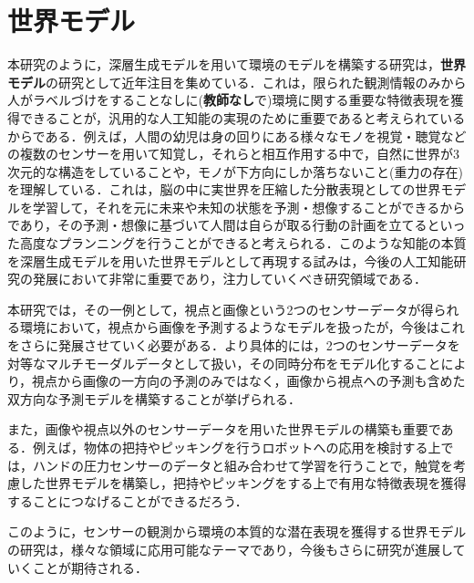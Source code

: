 \section{世界モデル}
本研究のように，深層生成モデルを用いて環境のモデルを構築する研究は，{\bf 世界モデル}の研究として近年注目を集めている．これは，限られた観測情報のみから人がラベルづけをすることなしに({\bf 教師なし}で)環境に関する重要な特徴表現を獲得できることが，汎用的な人工知能の実現のために重要であると考えられているからである．例えば，人間の幼児は身の回りにある様々なモノを視覚・聴覚などの複数のセンサーを用いて知覚し，それらと相互作用する中で，自然に世界が3次元的な構造をしていることや，モノが下方向にしか落ちないこと(重力の存在)を理解している．これは，脳の中に実世界を圧縮した分散表現としての世界モデルを学習して，それを元に未来や未知の状態を予測・想像することができるからであり，その予測・想像に基づいて人間は自らが取る行動の計画を立てるといった高度なプランニングを行うことができると考えられる．このような知能の本質を深層生成モデルを用いた世界モデルとして再現する試みは，今後の人工知能研究の発展において非常に重要であり，注力していくべき研究領域である．

本研究では，その一例として，視点と画像という2つのセンサーデータが得られる環境において，視点から画像を予測するようなモデルを扱ったが，今後はこれをさらに発展させていく必要がある．より具体的には，2つのセンサーデータを対等なマルチモーダルデータとして扱い，その同時分布をモデル化することにより，視点から画像の一方向の予測のみではなく，画像から視点への予測も含めた双方向な予測モデルを構築することが挙げられる．

また，画像や視点以外のセンサーデータを用いた世界モデルの構築も重要である．例えば，物体の把持やピッキングを行うロボットへの応用を検討する上では，ハンドの圧力センサーのデータと組み合わせて学習を行うことで，触覚を考慮した世界モデルを構築し，把持やピッキングをする上で有用な特徴表現を獲得することにつなげることができるだろう．

このように，センサーの観測から環境の本質的な潜在表現を獲得する世界モデルの研究は，様々な領域に応用可能なテーマであり，今後もさらに研究が進展していくことが期待される．